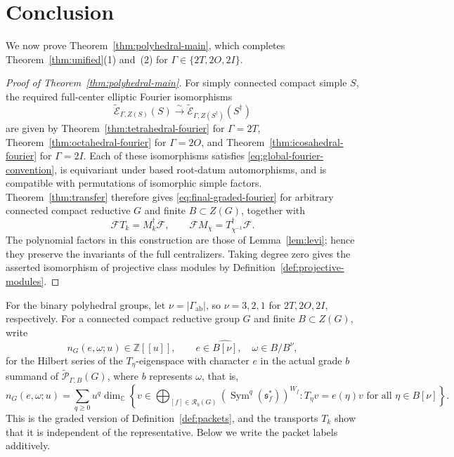 \documentclass[11pt,a4paper,reqno]{amsart}
\theoremstyle{plain}
\theoremstyle{definition}
\theoremstyle{remark}
\numberwithin{equation}{section}
\DeclareMathOperator{\Sym}{Sym}
\newcommand{\CC}{\mathbb C}
\newcommand{\ZZ}{\mathbb Z}
\newcommand{\cR}{\mathcal R}
\newcommand{\wtE}{\widetilde{\mathcal E}}
\newcommand{\wtP}{\widetilde{\mathcal P}}
\begin{document}
\section{Conclusion}\label{sec:polyhedral-conclusion}

We now prove Theorem~\ref{thm:polyhedral-main}, which completes Theorem~\ref{thm:unified}\textup{(1)} and~\textup{(2)} for $\Gamma\in\{2T,2O,2I\}$.

\begin{proof}[Proof of Theorem~\ref{thm:polyhedral-main}]
For simply connected compact simple $S$, the required full-center elliptic Fourier isomorphisms
\[
\wtE_{\Gamma,Z(S)}(S)\xrightarrow{\sim}\wtE_{\Gamma,Z(S^\dagger)}(S^\dagger)
\]
are given by Theorem~\ref{thm:tetrahedral-fourier} for $\Gamma=2T$, Theorem~\ref{thm:octahedral-fourier} for $\Gamma=2O$, and Theorem~\ref{thm:icosahedral-fourier} for $\Gamma=2I$. Each of these isomorphisms satisfies \eqref{eq:global-fourier-convention}, is equivariant under based root-datum automorphisms, and is compatible with permutations of isomorphic simple factors. Theorem~\ref{thm:transfer} therefore gives \eqref{eq:final-graded-fourier} for arbitrary connected compact reductive $G$ and finite $B\subset Z(G)$, together with
\[
\mathcal F T_k=M_k^\dagger\mathcal F,\qquad \mathcal F M_\chi=T_{\chi^{-1}}^\dagger\mathcal F.
\]
The polynomial factors in this construction are those of Lemma~\ref{lem:levi}; hence they preserve the invariants of the full centralizers. Taking degree zero gives the asserted isomorphism of projective class modules by Definition~\ref{def:projective-modules}.
\end{proof}

For the binary polyhedral groups, let $\nu=|\Gamma_{\mathrm{ab}}|$, so $\nu=3,2,1$ for $2T,2O,2I$, respectively. For a connected compact reductive group $G$ and finite $B\subset Z(G)$, write
\[
n_G(e,\omega;u)\in\ZZ[[u]],\qquad e\in\widehat{B[\nu]},\quad \omega\in B/B^\nu,
\]
for the Hilbert series of the $T_\eta$-eigenspace with character $e$ in the actual grade $b$ summand of $\wtP_{\Gamma,B}(G)$, where $b$ represents $\omega$, that is,
\[
n_G(e,\omega;u)=\sum_{q\ge0}u^q\dim_{\CC}\left\{v\in\bigoplus_{[f]\in\cR_b(G)}\left(\Sym^q(\mathfrak s_f^*)\right)^{W_f}:T_\eta v=e(\eta)v\text{ for all }\eta\in B[\nu]\right\}.
\]
This is the graded version of Definition~\ref{def:packets}, and the transports $T_k$ show that it is independent of the representative. Below we write the packet labels additively.
\end{document}
